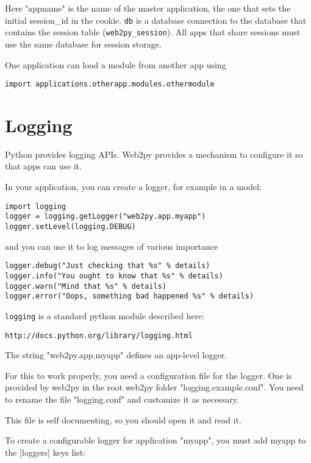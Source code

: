 \documentclass[justified,sixbynine,notoc]{tufte-book}
\def\ft{\small\tt}
\begin{document}
\begin{fullwidth}
Here "appname" is the name of the master application, the one that sets the initial session\_id in the cookie. {\ft db} is a database connection to the database that contains the session table ({\ft web2py\_session}). All apps that share sessions must use the same database for session storage.

One application can load a module from another app using

\begin{lstlisting}
import applications.otherapp.modules.othermodule
\end{lstlisting}

\goodbreak\section{Logging}

Python provides logging APIs. Web2py provides a mechanism to configure it so
that apps can use it.

In your application, you can create a logger, for example in a model:

\begin{lstlisting}
import logging
logger = logging.getLogger("web2py.app.myapp")
logger.setLevel(logging.DEBUG)
\end{lstlisting}
\noindent and you can use it to log messages of various importance

\begin{lstlisting}
logger.debug("Just checking that %s" % details)
logger.info("You ought to know that %s" % details)
logger.warn("Mind that %s" % details)
logger.error("Oops, something bad happened %s" % details)
\end{lstlisting}

{\ft logging} is a standard python module described here:
\begin{lstlisting}[keywords={}]
http://docs.python.org/library/logging.html
\end{lstlisting}
The string "web2py.app.myapp" defines an app-level logger.

For this to work properly, you need a configuration file for the logger.
One is provided by web2py in the root web2py folder "logging.example.conf". You need to rename the file "logging.conf" and customize it as necessary.

This file is self documenting, so you should open it and read it.

To create a configurable logger for application "myapp", you must add myapp to
the [loggers] keys list:


\end{fullwidth}
\end{document}
